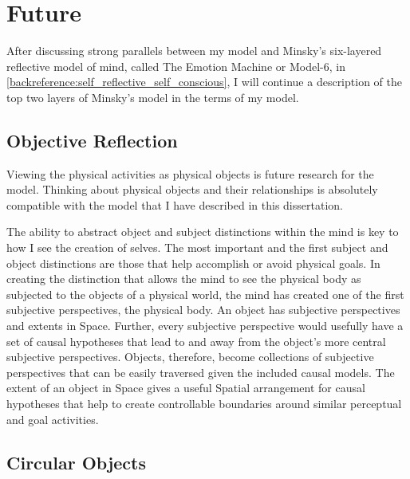 \chapter{Future}\label{chapter:future}

\label{section:model_6_future_research}

After discussing strong parallels between my model and Minsky's
six-layered reflective model of mind, called The Emotion Machine or
Model-6, in \autoref{backreference:self_reflective_self_conscious}, I
will continue a description of the top two layers of Minsky's model in
the terms of my model.

\section{Objective Reflection}
\label{section:objective_reflection}

Viewing the physical activities as physical objects is future research
for the model.  Thinking about physical objects and their
relationships is absolutely compatible with the model that I have
described in this dissertation.

The ability to abstract object and subject distinctions within the
mind is key to how I see the creation of selves.  The most important
and the first subject and object distinctions are those that help
accomplish or avoid physical goals.  In creating the distinction that
allows the mind to see the physical body as subjected to the objects
of a physical world, the mind has created one of the first subjective
perspectives, the physical body.  An object has subjective
perspectives and extents in Space.  Further, every subjective
perspective would usefully have a set of causal hypotheses that lead
to and away from the object's more central subjective perspectives.
Objects, therefore, become collections of subjective perspectives that
can be easily traversed given the included causal models.  The extent
of an object in Space gives a useful Spatial arrangement for causal
hypotheses that help to create controllable boundaries around similar
perceptual and goal activities.

\section{Circular Objects}

